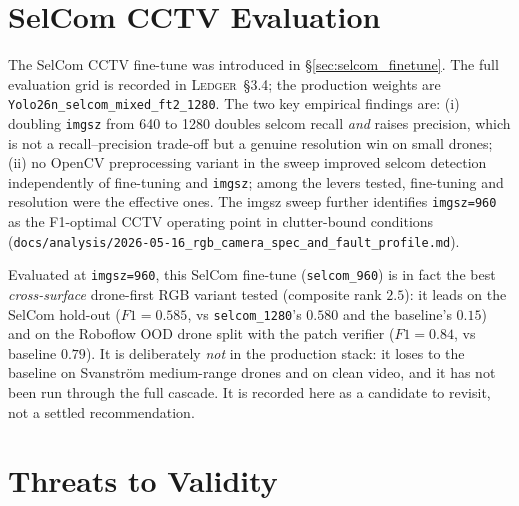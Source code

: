 \documentclass[12pt,a4paper,oneside,openright]{book}
\begin{document}
\section{SelCom CCTV Evaluation}
\label{sec:selcom}

The SelCom CCTV fine-tune was introduced in \S\ref{sec:selcom_finetune}. The full evaluation grid is recorded in \textsc{Ledger}~\S3.4; the production weights are \texttt{Yolo26n\_selcom\_mixed\_ft2\_1280}. The two key empirical findings are: (i) doubling \texttt{imgsz} from 640 to 1280 doubles selcom recall \emph{and} raises precision, which is not a recall--precision trade-off but a genuine resolution win on small drones; (ii) no OpenCV preprocessing variant in the sweep improved selcom detection independently of fine-tuning and \texttt{imgsz}; among the levers tested, fine-tuning and resolution were the effective ones. The imgsz sweep further identifies \texttt{imgsz=960} as the F1-optimal CCTV operating point in clutter-bound conditions (\texttt{docs/analysis/2026-05-16\_rgb\_camera\_spec\_and\_fault\_profile.md}).

Evaluated at \texttt{imgsz=960}, this SelCom fine-tune (\texttt{selcom\_960}) is in fact the best \emph{cross-surface} drone-first RGB variant tested (composite rank $2.5$): it leads on the SelCom hold-out ($F1=0.585$, vs \texttt{selcom\_1280}'s $0.580$ and the baseline's $0.15$) and on the Roboflow OOD drone split with the patch verifier ($F1=0.84$, vs baseline $0.79$). It is deliberately \emph{not} in the production stack: it loses to the baseline on Svanstr\"om medium-range drones and on clean video, and it has not been run through the full cascade. It is recorded here as a candidate to revisit, not a settled recommendation.

\section{Threats to Validity}
\label{sec:threats}
\end{document}
